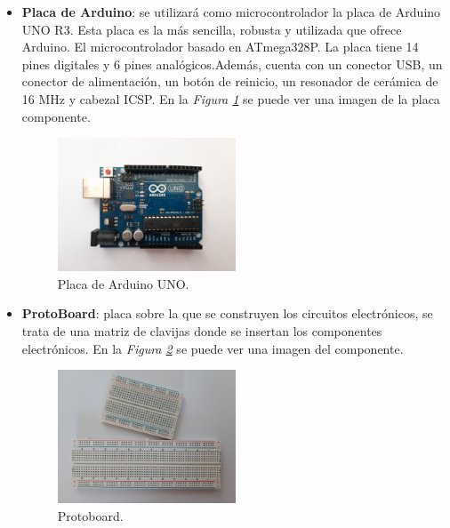 \begin{itemize}
\item \textbf{Placa de Arduino}\cite{Arduino1,Arduino2}: se utilizará como microcontrolador la placa de Arduino UNO R3. Esta placa es la más sencilla, robusta y utilizada que ofrece Arduino. El microcontrolador basado en ATmega328P\cite{atmega328P}. La placa tiene 14 pines digitales y 6 pines analógicos.Además, cuenta con un conector USB, un conector de alimentación, un botón de reinicio, un resonador de cerámica de 16 MHz y cabezal ICSP.  En la \textit{Figura \ref{fig:arduino}} se puede ver una imagen de la placa componente.
\begin{figure}[h!]
    \centering
    \includegraphics[width=0.5\textwidth]{img/imgArduinoUNO.jpg}
    \caption{Placa de Arduino UNO.}
    \label{fig:arduino} 
\end{figure}

\item \textbf{ProtoBoard}: placa sobre la que se construyen los circuitos electrónicos, se trata de una matriz de clavijas donde se insertan los componentes electrónicos. En la \textit{Figura \ref{fig:protoboard}} se puede ver una imagen del componente.
\begin{figure}[h!]
    \centering
    \includegraphics[width=0.5\textwidth]{img/imgProtoboards.JPG}
    \caption{Protoboard.}
    \label{fig:protoboard} 
\end{figure}


\end{itemize}
